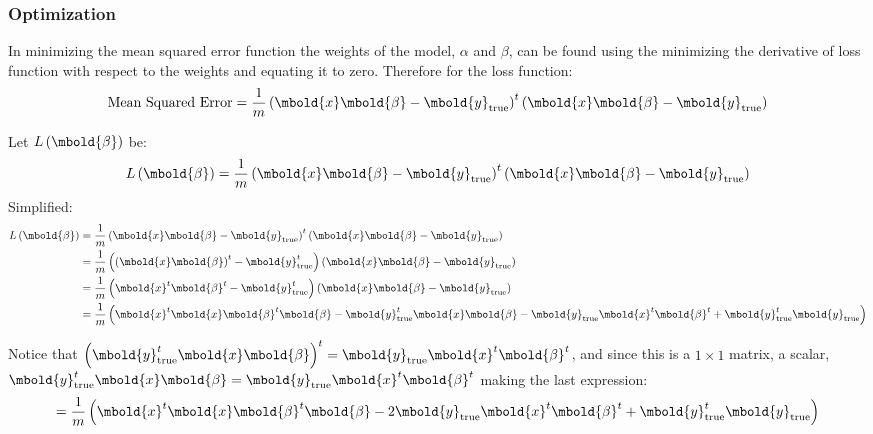 \documentclass[12pt letter]{report}
\begin{document}
\subsubsection{Optimization}

In minimizing the mean squared error function the weights of the model, $\alpha$ and $\beta$, can be found using the
minimizing the derivative of loss function with respect to the weights and equating it to zero. Therefore for the
loss function:
\[
  \text{Mean Squared Error} = \frac{1}{m} \left( \mbold{x} \mbold{\beta} - \mbold{y}_{\text{true}} \right)^{t} \left( \mbold{x} \mbold{\beta} - \mbold{y}_{\text{true}} \right)
\]

Let $L \left( \mbold{\beta} \right) $ be:
\[
  L \left( \mbold{\beta} \right) = \frac{1}{m} \left( \mbold{x} \mbold{\beta} - \mbold{y}_{\text{true}} \right)^{t} \left( \mbold{x} \mbold{\beta} - \mbold{y}_{\text{true}} \right)
\]
Simplified:
\begin{align*}
  L \left( \mbold{\beta} \right) & = \frac{1}{m} \left( \mbold{x} \mbold{\beta} - \mbold{y}_{\text{true}} \right)^{t}
  \left( \mbold{x} \mbold{\beta} - \mbold{y}_{\text{true}} \right)                                                    \\
                                 & = \frac{1}{m} \left( \left( \mbold{x}\mbold{\beta} \right)^{t} -
  \mbold{y}_{\text{true}}^{t}  \right) \left( \mbold{x}\mbold{\beta} -
  \mbold{y}_{\text{true}} \right)                                                                                     \\
                                 & = \frac{1}{m} \left( \mbold{x}^{t}\mbold{\beta}^{t} - \mbold{y}_{\text{true}}^{t}
  \right) \left( \mbold{x}\mbold{\beta} - \mbold{y}_{\text{true}} \right)                                             \\
                                 & = \frac{1}{m} \left( \mbold{x}^{t}\mbold{x} \mbold{\beta}^{t}\mbold{\beta} -
  \mbold{y}_{\text{true}}^{t}\mbold{x}\mbold{\beta} -
  \mbold{y}_{\text{true}}\mbold{x}^{t}\mbold{\beta}^{t} + \mbold{y}_{\text{true}}^{t}
  \mbold{y}_{\text{true}} \right)                                                                                     \\
\end{align*}

Notice that $ \left( \mbold{y}^{t}_{\text{true}} \mbold{x} \mbold{\beta} \right)^{t} = \mbold{y}_{\text{true}}
  \mbold{x}^{t} \mbold{\beta}^{t} $, and since this is a $1\times 1$ matrix, a scalar, $ \mbold{y}^{t}_{\text{true}}
  \mbold{x} \mbold{\beta} = \mbold{y}_{\text{true}} \mbold{x}^{t} \mbold{\beta}^{t} $ making the last expression:
\[
  = \frac{1}{m} \left( \mbold{x}^{t}\mbold{x} \mbold{\beta}^{t}\mbold{\beta} -2
  \mbold{y}_{\text{true}}\mbold{x}^{t}\mbold{\beta}^{t} + \mbold{y}_{\text{true}}^{t}
  \mbold{y}_{\text{true}} \right)
\]
\end{document}
